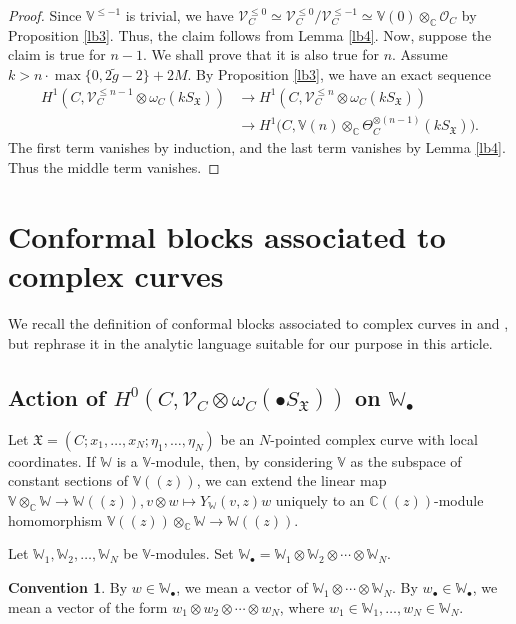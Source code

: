\documentclass[11pt,b5paper,notitlepage]{article}
\theoremstyle{definition}
\newtheorem{cv}[df]{Convention}
\theoremstyle{plain}
\newcommand{\fk}{\mathfrak}
\newcommand{\wtd}{\widetilde}
\newcommand{\scr}{\mathscr}
\newcommand{\SX}{S_{\fk X}}
\newcommand{\blt}{\bullet}
\newcommand{\Vbb}{\mathbb V}
\newcommand{\Wbb}{\mathbb W}
\newcommand{\Cbb}{\mathbb C}
\numberwithin{equation}{section}
\begin{document}
\begin{proof}
Since $\Vbb^{\leq-1}$ is trivial, we have $\scr V_C^{\leq 0}\simeq \scr V_C^{\leq 0}/\scr V_C^{\leq -1}\simeq\Vbb(0)\otimes_\Cbb\scr O_C$ by Proposition \ref{lb3}. Thus, the claim follows from Lemma \ref{lb4}. Now, suppose the claim is true for $n-1$. We shall prove that it is also true for $n$. Assume $k>n\cdot\max\{0,2\wtd g-2\}+2M$.  By Proposition \ref{lb3}, we have an exact sequence
\begin{align*}
H^1(C,\scr V_C^{\leq n-1}\otimes\omega_C(k\SX))&\rightarrow H^1(C,\scr V_C^{\leq n}\otimes\omega_C(k\SX))\nonumber\\
&\rightarrow H^1\big(C,\Vbb(n)\otimes_{\Cbb}\Theta_C^{\otimes(n-1)}(k\SX)\big).
\end{align*}
The first term vanishes by induction, and the last term vanishes by Lemma \ref{lb4}. Thus the middle term vanishes.
\end{proof}






\section{Conformal blocks associated to complex curves}\label{lb15}


We recall the definition of conformal blocks associated to complex curves in \cite{FB04} and \cite{DGT19a,DGT19b}, but rephrase it in the analytic language suitable for our purpose in this article.


\subsection*{Action of $H^0(C,\scr V_C\otimes\omega_C(\blt S_{\fk X}))$ on $\Wbb_\blt$}


Let $\fk X=(C;x_1,\dots,x_N;\eta_1,\dots,\eta_N)$ be an $N$-pointed complex curve with local coordinates. If $\Wbb$ is a $\Vbb$-module, then, by considering $\Vbb$ as the subspace of constant sections of $\Vbb((z))$, we can extend the linear map $\Vbb\otimes_\Cbb\Wbb\rightarrow\Wbb((z)),v\otimes w\mapsto Y_\Wbb(v,z)w$ uniquely to an $\Cbb((z))$-module homomorphism  $\Vbb((z))\otimes_\Cbb\Wbb\rightarrow\Wbb((z))$. 


Let $\Wbb_1,\Wbb_2,\dots,\Wbb_N$ be $\Vbb$-modules. Set \index{Ww@$\Wbb_\blt,w_\blt$} $\Wbb_\blt=\Wbb_1\otimes \Wbb_2\otimes\cdots\otimes \Wbb_N$.  


\begin{cv}
	By $w\in\Wbb_\blt$, we mean a vector of $\Wbb_1\otimes\cdots\otimes \Wbb_N$.  By $w_\blt\in \Wbb_\blt$, we mean a vector of the form $w_1\otimes w_2\otimes\cdots\otimes w_N$, where $w_1\in \Wbb_1,\dots,w_N\in\Wbb_N$.
\end{cv}
\end{document}
